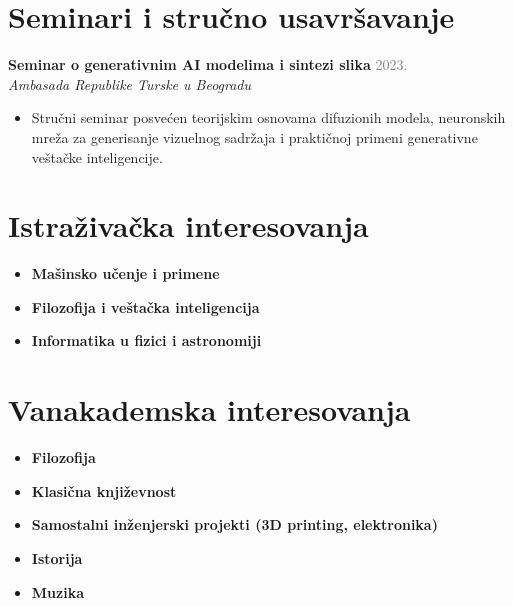 \documentclass[10pt, letterpaper]{article}
\newcommand{\entry}[4]{
  \vspace{1.5ex}
  \noindent\textbf{#1} \hfill \textcolor{graytext}{\small #2} \\
  \noindent\textit{#3} \hfill \textcolor{graytext}{\small #4}
  \vspace{0.5ex}
}
\begin{document}
\vspace{2ex}
\section*{Seminari i stručno usavršavanje}
\entry{Seminar o generativnim AI modelima i sintezi slika}{2023.}{Ambasada Republike Turske u Beogradu}{}
\begin{itemize}[leftmargin=1.5em, topsep=0.2ex, itemsep=0.2ex]
    \item Stručni seminar posvećen teorijskim osnovama difuzionih modela, neuronskih mreža za generisanje vizuelnog sadržaja i praktičnoj primeni generativne veštačke inteligencije.
\end{itemize}

\vspace{2ex}

\section*{Istraživačka interesovanja}
\vspace{1ex}
\begin{itemize}[leftmargin=1.5em, topsep=0.8ex, itemsep=0.3ex]
    \item \textbf{Mašinsko učenje i primene}
    \item \textbf{Filozofija i veštačka inteligencija}
    \item \textbf{Informatika u fizici i astronomiji}
\end{itemize}

\vspace{2ex}

\section*{Vanakademska interesovanja}
\vspace{1ex}
\begin{itemize}[leftmargin=1.5em, topsep=0.8ex, itemsep=0.3ex]
    \item \textbf{Filozofija}
    \item \textbf{Klasična književnost}
    \item \textbf{Samostalni inženjerski projekti (3D printing, elektronika)}
    \item \textbf{Istorija}
    \item \textbf{Muzika}
\end{itemize}
\end{document}
